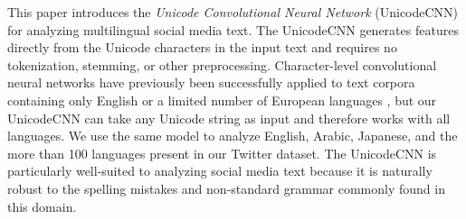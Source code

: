 \documentclass[sigconf,anonymous,review]{acmart}
\newcommand{\defn}[1]{\textit{#1}}
\begin{document}
This paper introduces the \defn{Unicode Convolutional Neural Network} (UnicodeCNN) for analyzing multilingual social media text.
The UnicodeCNN generates features directly from the Unicode characters in the input text and requires no tokenization, stemming, or other preprocessing.
Character-level convolutional neural networks have previously been successfully applied to text corpora containing only English \citep{zhang2015character,conneau2017very} or a limited number of European languages \citep{lee2016fully,wehrmann2017character},
but our UnicodeCNN can take any Unicode string as input and therefore works with all languages.
We use the same model to analyze English, Arabic, Japanese, and the more than 100 languages present in our Twitter dataset.
The UnicodeCNN is particularly well-suited to analyzing social media text because it is naturally robust to the spelling mistakes and non-standard grammar commonly found in this domain.
\end{document}
